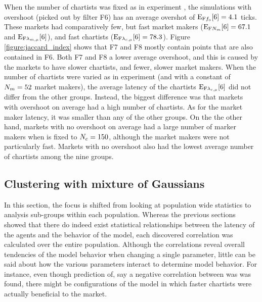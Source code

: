 When the number of chartists was fixed as in experiment \dten, the simulations with overshoot (picked out by filter F6) has an average overshot of $\mathrm{E}_\text{F{\ensuremath{f_\text{o}}}}[6] = 4.1$ ticks. These markets had comparatively few, but fast market makers ($\mathrm{E}_\text{F{\ensuremath{N_{m}}}}[6] = 67.1$ and $\mathrm{E}_\text{F{\ensuremath{\lambda_{m, \mu}}}}[6]$), and fast chartists ($\mathrm{E}_\text{F{\ensuremath{\lambda_{c, \mu}}}}[6] = 78.3$). Figure \ref{figure:jaccard_index} shows that F7 and F8 mostly contain points that are also contained in F6. Both F7 and F8 a lower average overshoot, and this is caused by the markets to have slower chartists, and fewer, slower market makers. When the number of chartists were varied as in experiment \deleven{} (and with a constant of $N_{m}=52$ market makers), the average latency of the chartists $\mathrm{E}_\text{F{\ensuremath{\lambda_{c, \mu}}}}[6]$ did not differ from the other groups. Instead, the biggest difference was that markets with overshoot on average had a high number of chartists. As for the market maker latency, it was smaller than any of the other groups. On the the other hand, markets with no overshoot on average had a large number of marker makers when \scnAgents{} is fixed to $N_{c} = 150$, although the market makers were not particularly fast. Markets with no overshoot also had the lowest average number of chartists among the nine groups.


\subsection{Clustering with mixture of Gaussians}\label{section:clustering}
In this section, the focus is shifted from looking at population wide statistics to analysis sub-groups within each population. Whereas the previous sections showed that there do indeed exist statistical relationships between the latency of the agents and the behavior of the model, each discovered correlation was calculated over the entire population. Although the correlations reveal overall tendencies of the model behavior when changing a single parameter, little can be said about how the various parameters interact to determine model behavior. For instance, even though prediction of, say a negative correlation between \timetoreachnewfundamental{} was \sclatencymu{} was found, there might be configurations of the model in which faster chartists were actually beneficial to the market. 

